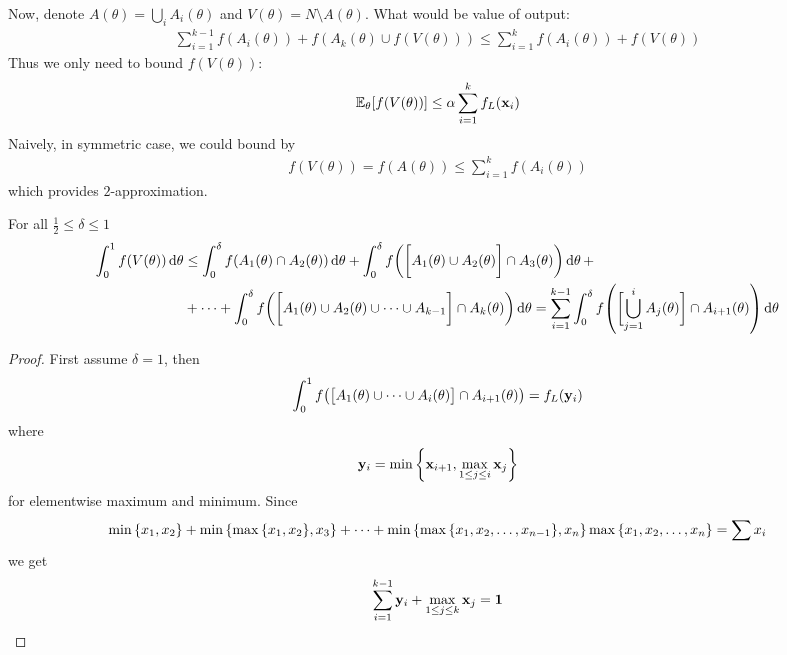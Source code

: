 Now, denote $A(\theta) = \bigcup_i A_i(\theta)$ and $V(\theta) = N \setminus A(\theta)$. What would be value of output:
\begin{align}
\sum_{i=1}^{k-1} f(A_i(\theta)) + f(A_k(\theta) \cup f(V(\theta))) \leq \sum_{i=1}^k f(A_i(\theta)) + f(V(\theta))
\end{align}
Thus we only need to bound $f(V(\theta))$:
\begin{align}
\mathbb{E}_\theta [f(V(\theta))] \leq \alpha \sum_{i=1}^{k} f_L(\vb{x}_i) 
\end{align}
Naively, in symmetric case, we could bound by
\begin{align}
f(V(\theta)) = f(A(\theta)) \leq \sum_{i=1}^{k} f(A_i(\theta))  
\end{align}
which provides $2$-approximation.
\begin{lemma}\label{th:delta_lemma}
	For all $\frac{1}{2} \leq \delta \leq 1$
	\begin{align}
	\int_0^1 f(V(\theta)) \dd{\theta} &\leq \int_0^\delta f(A_1(\theta) \cap A_2(\theta)) \dd{\theta} + \int_0^\delta f\qty(\qty\bigg[A_1(\theta) \cup A_2(\theta)] \cap A_3(\theta)) \dd{\theta} +\\&+ \dots + \int_0^\delta f\qty(\qty\bigg[A_1(\theta) \cup A_2(\theta) \cup \dots \cup A_{k-1}] \cap A_k(\theta)) \dd{\theta} = \sum_{i=1}^{k-1} \int_0^\delta f\qty(\qty\bigg[ \bigcup_{j=1}^{i} A_j(\theta)] \cap A_{i+1}(\theta)) \dd{\theta} 
	\end{align}
	\begin{proof}
		First assume $\delta=1$, then
		\begin{align}
		\int_0^1 f\qty(\qty\big[A_1(\theta) \cup \dots \cup A_{i}(\theta)] \cap A_{i+1}(\theta)) = f_L(\vb{y}_i)
		\end{align}
		where
		\begin{align}
		\vb{y}_i = \min \qty{\vb{x}_{i+1},\max\limits_{1\leq j \leq i} \vb{x}_j  }
		\end{align}
		for elementwise maximum and minimum. Since
		\begin{align}
		\min\qty{x_1, x_2} + \min\qty{\max\qty{x_1, x_2} , x_3} +\dots + \min\qty{\max\qty{x_1, x_2, \dots, x_{n-1}} , x_n} \max\qty{x_1, x_2, \dots, x_{n}} = \sum x_i
		\end{align}
		we get
		\begin{align}
		\sum_{i=1}^{k-1} \vb{y}_i + \max\limits_{1\leq j \leq k} \vb{x}_j  = \vb{1}
		\end{align}
		

\end{proof}
\end{lemma}
